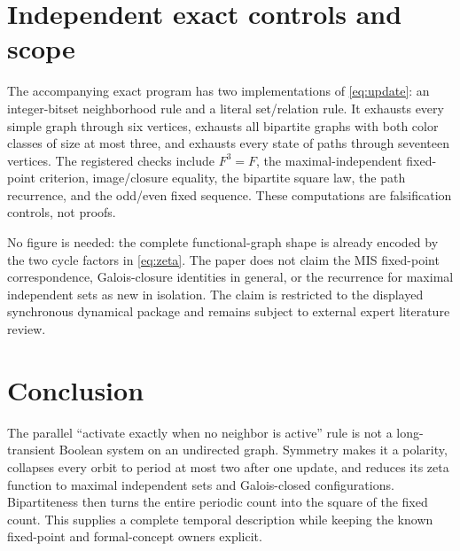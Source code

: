 \documentclass[11pt,a4paper]{amsart}
\theoremstyle{definition}
\theoremstyle{remark}
\begin{document}
\section{Independent exact controls and scope}

The accompanying exact program has two implementations of \eqref{eq:update}:
an integer-bitset neighborhood rule and a literal set/relation rule.  It
exhausts every simple graph through six vertices, exhausts all bipartite
graphs with both color classes of size at most three, and exhausts every
state of paths through seventeen vertices.  The registered checks include
$F^3=F$, the maximal-independent fixed-point criterion, image/closure
equality, the bipartite square law, the path recurrence, and the odd/even
fixed sequence.  These computations are falsification controls, not proofs.

No figure is needed: the complete functional-graph shape is already encoded
by the two cycle factors in \eqref{eq:zeta}.  The paper does not claim the
MIS fixed-point correspondence, Galois-closure identities in general, or
the recurrence for maximal independent sets as new in isolation.  The
claim is restricted to the displayed synchronous dynamical package and
remains subject to external expert literature review.

\section{Conclusion}

The parallel ``activate exactly when no neighbor is active'' rule is not a
long-transient Boolean system on an undirected graph.  Symmetry makes it a
polarity, collapses every orbit to period at most two after one update, and
reduces its zeta function to maximal independent sets and Galois-closed
configurations.  Bipartiteness then turns the entire periodic count into the
square of the fixed count.  This supplies a complete temporal description
while keeping the known fixed-point and formal-concept owners explicit.



\end{document}
